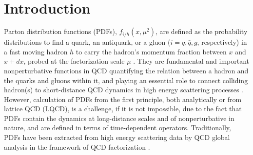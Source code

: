 \section{Introduction}
\label{sec:intro}

Parton distribution functions (PDFs), $f_{i/h}(x,\mu^2)$, are defined as the probability distributions to find a quark, an antiquark, or a gluon ($i=q,\bar{q},g$, respectively) in a fast moving hadron $h$ to carry the hadron's momentum fraction between $x$ and $x+dx$,
probed at the factorization scale $\mu$ \cite{Collins:1989gx}. They are fundamental and important nonperturbative functions in QCD quantifying the relation between a hadron and the quarks and gluons within it, and playing an essential role to connect colliding hadron(s) to short-distance QCD dynamics in high energy scattering processes \cite{Brambilla:2014jmp}. However, calculation of PDFs from the first principle, both analytically or from lattice QCD (LQCD), is a challenge, if it is not impossible, due to the fact that PDFs contain the dynamics at long-distance scales and of nonperturbative in nature, and are defined in terms of time-dependent operators.  Traditionally, PDFs have been extracted from high energy scattering data by QCD global analysis in the framework of QCD factorization \cite{Dulat:2015mca,Martin:2009iq,Ball:2014uwa,Alekhin:2013nda,Ethier:2017zbq}.

